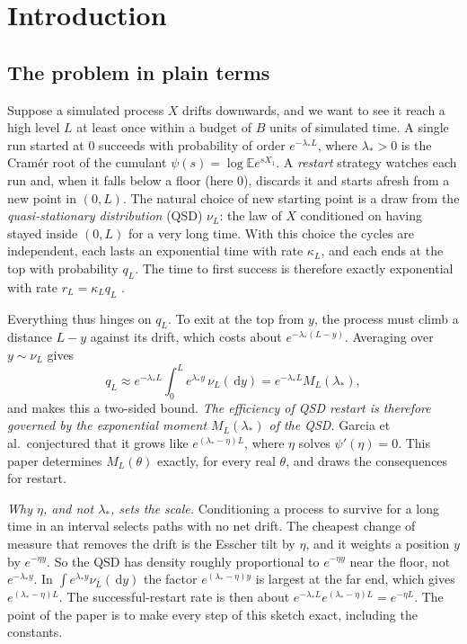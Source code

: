 \documentclass[11pt,a4paper]{article}
\theoremstyle{definition}
\theoremstyle{remark}
\newcommand{\E}{\mathbb E}
\newcommand{\1}{\mathbf 1}
\newcommand{\dd}{\,\mathrm d}
\begin{document}
\section{Introduction}\label{sec:intro}

\subsection{The problem in plain terms}\label{sec:plain}
Suppose a simulated process $X$ drifts downwards, and we want to see it reach a high level $L$ at least once within a budget of $B$ units of simulated time. A single run started at $0$ succeeds with probability of order $e^{-\lambda_* L}$, where $\lambda_*>0$ is the Cram\'er root of the cumulant $\psi(s)=\log\E e^{sX_1}$. A \emph{restart} strategy watches each run and, when it falls below a floor (here $0$), discards it and starts afresh from a new point in $(0,L)$. The natural choice of new starting point is a draw from the \emph{quasi-stationary distribution} (QSD) $\nu_L$: the law of $X$ conditioned on having stayed inside $(0,L)$ for a very long time. With this choice the cycles are independent, each lasts an exponential time with rate $\kappa_L$, and each ends at the top with probability $q_L$. The time to first success is therefore exactly exponential with rate $r_L=\kappa_Lq_L$ \cite[Lemma 6.2]{garcia}.

Everything thus hinges on $q_L$. To exit at the top from $y$, the process must climb a distance $L-y$ against its drift, which costs about $e^{-\lambda_*(L-y)}$. Averaging over $y\sim\nu_L$ gives
\[
 q_L\approx e^{-\lambda_* L}\int_0^L e^{\lambda_* y}\,\nu_L(\dd y)=e^{-\lambda_*L}M_L(\lambda_*),
\]
and \cite[Lemma 5.1]{garcia} makes this a two-sided bound. \emph{The efficiency of QSD restart is therefore governed by the exponential moment $M_L(\lambda_*)$ of the QSD.} Garcia et al.\ conjectured that it grows like $e^{(\lambda_*-\eta)L}$, where $\eta$ solves $\psi'(\eta)=0$. This paper determines $M_L(\theta)$ exactly, for every real $\theta$, and draws the consequences for restart.

\emph{Why $\eta$, and not $\lambda_*$, sets the scale.} Conditioning a process to survive for a long time in an interval selects paths with no net drift. The cheapest change of measure that removes the drift is the Esscher tilt by $\eta$, and it weights a position $y$ by $e^{-\eta y}$. So the QSD has density roughly proportional to $e^{-\eta y}$ near the floor, not $e^{-\lambda_* y}$. In $\int e^{\lambda_* y}\nu_L(\dd y)$ the factor $e^{(\lambda_*-\eta)y}$ is largest at the far end, which gives $e^{(\lambda_*-\eta)L}$. The successful-restart rate is then about $e^{-\lambda_*L}e^{(\lambda_*-\eta)L}=e^{-\eta L}$. The point of the paper is to make every step of this sketch exact, including the constants.
\end{document}
